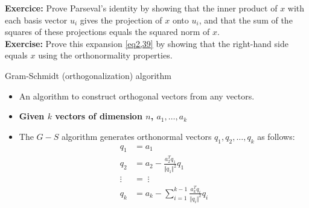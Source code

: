 \begin{frame}
    \textbf{Exercice:} Prove Parseval's identity by showing that the inner product of $x$ with each basis vector $u_i$ gives the projection of $x$ onto $u_i$, and that the sum of the squares of these projections equals the squared norm of $x$.\\
    \textbf{Exercise:} Prove this expansion \ref{eq2,39} by showing that the right-hand side equals $x$ using the orthonormality properties.
\end{frame}



\begin{frame}{Gram-Schmidt (orthogonalization) algorithm}
    \begin{itemize}
        \item An algorithm to construct orthogonal vectors from any vectors.
    \item \textbf{Given $k$ vectors of dimension $n$, $a_1,\ldots,a_k$}
    \item The $G-S$ algorithm generates orthonormal vectors $q_1, q_2, \ldots, q_k$ as follows:
    \begin{align*}
        q_1 & = a_1\\
        q_2 & = a_2 - \frac{a_2^Tq_1}{\Vert q_1 \Vert^2}q_1\\
      \vdots \;\; & = \; \vdots \\
        q_k & = a_k - \sum_{i=1}^{k-1} \frac{a_k^Tq_i}{\Vert q_i \Vert^2}q_i
    \end{align*}
    \end{itemize}
\end{frame}

